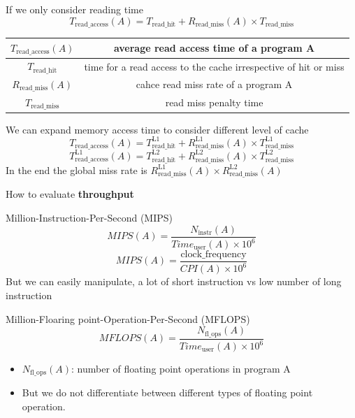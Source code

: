 \documentclass{article}
\begin{document}
If we only consider reading time
\[
    T_\text{read\_access} \left( A \right) = T_\text{read\_hit} + R_\text{read\_miss} \left( A \right) \times T_\text{read\_miss}
\]
\begin{center}
    \begin{tabular}{ |c|c| }
        \hline
        $T_\text{read\_access} \left( A \right)$ & average read access time of a program A                         \\
        \hline
        $T_\text{read\_hit}$                     & time for a read access to the cache irrespective of hit or miss \\
        \hline
        $R_\text{read\_miss} \left( A \right)$   & cahce read miss rate of a program A                             \\
        \hline
        $T_\text{read\_miss}$                    & read miss penalty time                                          \\
        \hline
    \end{tabular}
\end{center}

We can expand memory access time to consider different level of cache
\[
    T_\text{read\_access} \left( A \right) = T^\text{L1}_\text{read\_hit} + R^\text{L1}_\text{read\_miss} \left( A \right) \times T^\text{L1}_\text{read\_miss}
\]
\[
    T^\text{L1}_\text{read\_access} \left( A \right) = T^\text{L2}_\text{read\_hit} + R^\text{L2}_\text{read\_miss} \left( A \right) \times T^\text{L2}_\text{read\_miss}
\]
In the end the global miss rate is $R^\text{L1}_\text{read\_miss} \left( A \right) \times R^\text{L2}_\text{read\_miss} \left( A \right)$

How to evaluate \textbf{throughput}

Million-Instruction-Per-Second (MIPS)
\[
    MIPS \left( A \right) = \frac{N_\text{instr} \left( A \right)}{Time_\text{user} \left( A \right) \times 10^6}
\]
\[
    MIPS \left( A \right) = \frac{\text{clock\_frequency}}{CPI \left( A \right) \times 10^6}
\]
But we can easily manipulate, a lot of short instruction vs low number of long instruction

Million-Floaring point-Operation-Per-Second (MFLOPS)
\[
    MFLOPS \left( A \right) = \frac{N_\text{fl\_ops} \left( A \right)}{Time_\text{user} \left( A \right) \times 10^6}
\]
\begin{itemize}
    \item $N_\text{fl\_ops} \left( A \right)$: number of floating point operations in program A
    \item But we do not differentiate between different types of floating point operation.
\end{itemize}
\end{document}
